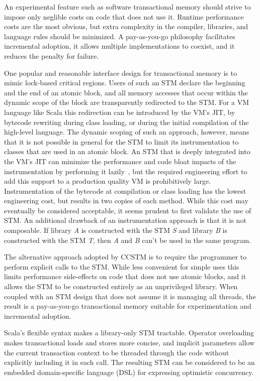 
An experimental feature such as software transactional memory should
strive to impose only neglible costs on code that does not use it.
Runtime performance costs are the most obvious, but extra complexity in
the compiler, libraries, and language rules should be minimized.
A pay-as-you-go philosophy facilitates incremental adoption, it allows
multiple implementations to coexist, and it reduces the penalty for
failure.

One popular and reasonable interface design for transactional memory
is to mimic lock-based critical regions.  Users of such an STM declare
the beginning and the end of an atomic block, and all memory accesses
that occur within the dynamic scope of the block are transparently
redirected to the STM.  For a VM language like Scala this redirection
can be introduced by the VM's JIT, by bytecode rewriting during class
loading, or during the initial
compilation of the high-level language.  The dynamic scoping of such an approach,
however, means that it is not possible in general for the STM to
limit its instrumentation to classes that are used in an atomic block.
An STM that is deeply integrated into the VM's JIT can minimize the
performance and code bloat impacts of the instrumentation by performing it
lazily~\cite{??}, but the required engineering effort to add this support
to a production quality VM is prohibitively large.  Instrumentation of
the bytecode at compilation or class loading has the lowest engineering
cost, but results in two copies of each method.
While this cost may eventually be considered acceptable, it seems
prudent to first validate the use of STM.  An additional drawback of
an instrumentation approach is that it is not composable.  If library
\textit{A} is constructed with the STM \textit{S} and library \textit{B}
is constructed with the STM \textit{T}, then \textit{A} and \textit{B}
can't be used in the same program.

The alternative approach adopted by CCSTM is to require the programmer to perform
explicit calls to the STM.  While less convenient for simple uses this
limits performance side-effects on code that does not use atomic blocks, and it
allows the STM to be constructed entirely as an unprivileged library.
When coupled with an STM design that does not assume it is managing all
threads, the result is a pay-as-you-go transactional memory suitable
for experimentation and incremental adoption.

Scala's flexible syntax makes a library-only STM tractable.  Operator
overloading makes transactional loads and stores more concise,
and implicit parameters allow the current transaction context to be
threaded through the code without explicitly including it in each call.
The resulting STM can be considered to be an embedded domain-specific
language (DSL) for expressing optimistic concurrency.



